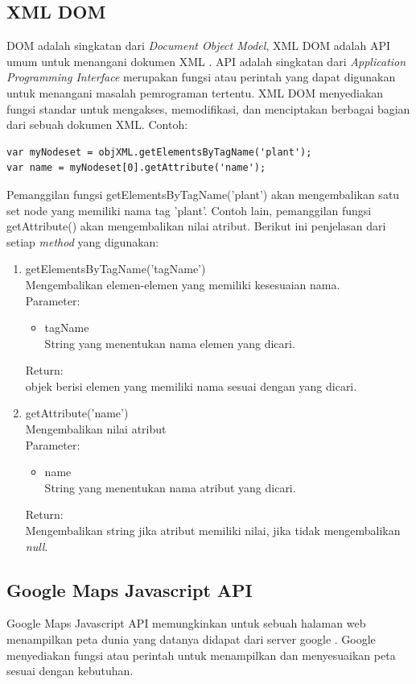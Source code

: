 \subsection{XML DOM}
DOM adalah singkatan dari \textit{Document Object Model}, XML DOM adalah API
umum untuk menangani dokumen XML \cite{Edmond:2006}. API adalah singkatan dari
\textit{Application Programming Interface} merupakan fungsi atau perintah yang dapat digunakan untuk
menangani masalah pemrograman tertentu. XML DOM menyediakan fungsi standar
untuk mengakses, memodifikasi, dan menciptakan berbagai bagian dari sebuah dokumen XML.
Contoh:
\begin{verbatim}
var myNodeset = objXML.getElementsByTagName('plant');
var name = myNodeset[0].getAttribute('name');
\end{verbatim}
Pemanggilan fungsi getElementsByTagName('plant') akan mengembalikan satu set
node yang memiliki nama tag 'plant'. Contoh lain, pemanggilan fungsi
getAttribute() akan mengembalikan nilai atribut. Berikut ini penjelasan dari 
setiap \textit{method} yang digunakan:
\begin{enumerate}
  \item getElementsByTagName('tagName')\\
  Mengembalikan elemen-elemen yang memiliki kesesuaian nama.\\
  Parameter:
  \begin{itemize}
    \item tagName\\
    String yang menentukan nama elemen yang dicari.
  \end{itemize}
  Return:\\
  objek berisi elemen yang memiliki nama sesuai dengan yang dicari.
  
  \item getAttribute('name')\\
  Mengembalikan nilai atribut\\
  Parameter:
  \begin{itemize}
    \item name\\
    String yang menentukan nama atribut yang dicari.
  \end{itemize}
  Return:\\
  Mengembalikan string jika atribut memiliki nilai, jika tidak mengembalikan
  \textit{null}.
\end{enumerate}


\subsection{Google Maps Javascript API}
Google Maps Javascript API memungkinkan untuk sebuah halaman web menampilkan
peta dunia yang datanya didapat dari server google \cite{gmap}. Google
menyediakan fungsi atau perintah untuk menampilkan dan menyesuaikan peta sesuai dengan
kebutuhan. 
\setcounter{secnumdepth}{3}
\setcounter{tocdepth}{3}
